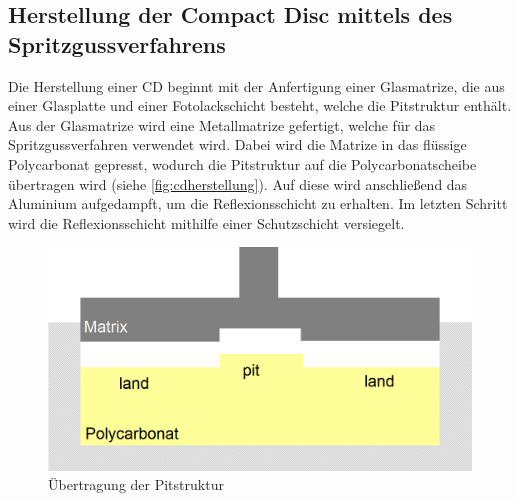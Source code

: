 \subsection{Herstellung der Compact Disc mittels des Spritzgussverfahrens}
\label{subsec:cdherstellung}

Die Herstellung einer CD beginnt mit der Anfertigung einer Glasmatrize, die aus
einer Glasplatte und einer Fotolackschicht besteht, welche die Pitstruktur
enthält. Aus der Glasmatrize wird eine Metallmatrize gefertigt, welche für das
Spritzgussverfahren verwendet wird. Dabei wird die Matrize in das flüssige
Polycarbonat gepresst, wodurch die Pitstruktur auf die Polycarbonatscheibe
übertragen wird (siehe \autoref{fig:cdherstellung}). Auf diese wird anschließend
das Aluminium aufgedampft, um die Reflexionsschicht zu erhalten. Im letzten
Schritt wird die Reflexionsschicht mithilfe einer Schutzschicht versiegelt.
\cite{cdp}

\begin{figure}[h]
    \begin{center}
        \begin{minipage}[t]{\textwidth}
            \begin{center}
                \includegraphics[height=0.1\textheight]{Bilder/Optische_Datentraeger_Die_Compact_Disc/Herstellung/cdherstellung.png}
                \caption[Übertragung der Pitstruktur \newline \url{http://daten.didaktikchemie.uni-bayreuth.de/umat/cd_dvd/spritzguss.gif} (zuletzt aufgerufen am 07.08.2015)]{Übertragung der Pitstruktur}
                \label{fig:cdherstellung}
            \end{center}
        \end{minipage}
    \end{center}
\end{figure}

